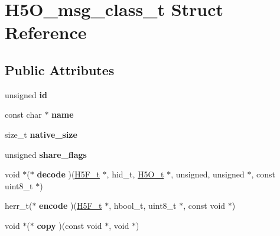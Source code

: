 \hypertarget{struct_h5_o__msg__class__t}{}\section{H5\+O\+\_\+msg\+\_\+class\+\_\+t Struct Reference}
\label{struct_h5_o__msg__class__t}
\subsection*{Public Attributes}
\begin{DoxyCompactItemize}
\item 
\mbox{\label{struct_h5_o__msg__class__t_af208913d8e91e1ef90797025fc959252}} 
unsigned {\bfseries id}
\item 
\mbox{\label{struct_h5_o__msg__class__t_aaa7fb9155eed0cd488bc9e81f9778d4e}} 
const char $\ast$ {\bfseries name}
\item 
\mbox{\label{struct_h5_o__msg__class__t_a2ba107bb7e3cc165fb480bf98d8c44fd}} 
size\+\_\+t {\bfseries native\+\_\+size}
\item 
\mbox{\label{struct_h5_o__msg__class__t_aacbd95fe906e9b761f03306736e8f0a8}} 
unsigned {\bfseries share\+\_\+flags}
\item 
\mbox{\label{struct_h5_o__msg__class__t_ad341b3fd38cc3ec8485aa7e83e057e52}} 
void $\ast$($\ast$ {\bfseries decode} )(\hyperlink{struct_h5_f__t}{H5\+F\+\_\+t} $\ast$, hid\+\_\+t, \hyperlink{struct_h5_o__t}{H5\+O\+\_\+t} $\ast$, unsigned, unsigned $\ast$, const uint8\+\_\+t $\ast$)
\item 
\mbox{\label{struct_h5_o__msg__class__t_ad8d3c20f77f540a7f4cb26ba018ac58c}} 
herr\+\_\+t($\ast$ {\bfseries encode} )(\hyperlink{struct_h5_f__t}{H5\+F\+\_\+t} $\ast$, hbool\+\_\+t, uint8\+\_\+t $\ast$, const void $\ast$)
\item 
\mbox{\label{struct_h5_o__msg__class__t_a9a4cd28341a7c4af92d1ec0fa029cec3}} 
void $\ast$($\ast$ {\bfseries copy} )(const void $\ast$, void $\ast$)
\item 

\end{DoxyCompactItemize}
